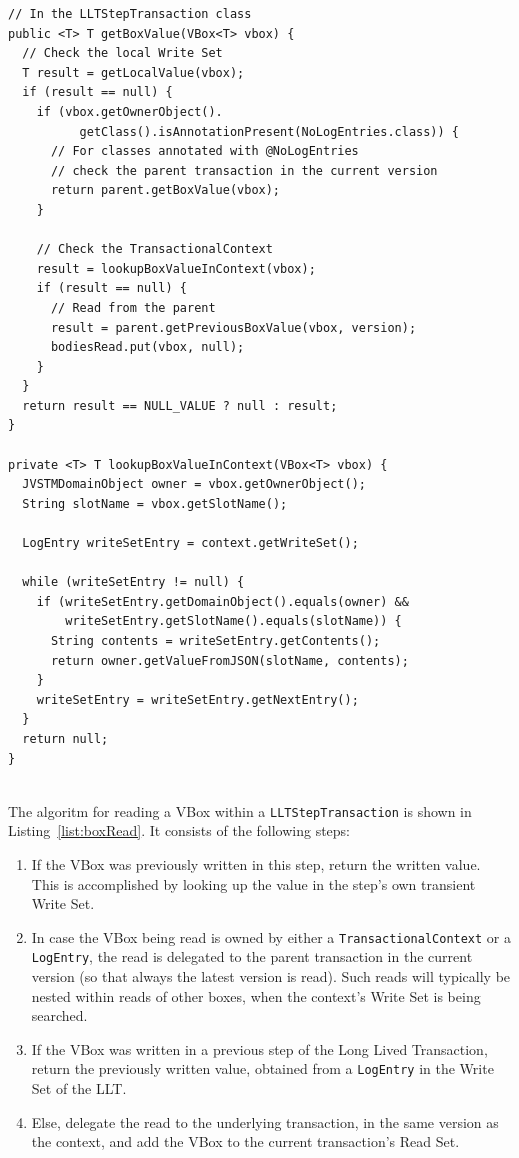 \documentclass{llncs}
\begin{document}
\begin{lstlisting}[caption={Reading a VBox within a
    LLTStepTransaction}, label={list:boxRead}, float]
// In the LLTStepTransaction class
public <T> T getBoxValue(VBox<T> vbox) {
  // Check the local Write Set
  T result = getLocalValue(vbox);
  if (result == null) {
    if (vbox.getOwnerObject().
          getClass().isAnnotationPresent(NoLogEntries.class)) {
      // For classes annotated with @NoLogEntries
      // check the parent transaction in the current version
      return parent.getBoxValue(vbox);
    }

    // Check the TransactionalContext
    result = lookupBoxValueInContext(vbox);
    if (result == null) {
      // Read from the parent
      result = parent.getPreviousBoxValue(vbox, version);
      bodiesRead.put(vbox, null);
    }
  }
  return result == NULL_VALUE ? null : result;
}

private <T> T lookupBoxValueInContext(VBox<T> vbox) {
  JVSTMDomainObject owner = vbox.getOwnerObject();
  String slotName = vbox.getSlotName();

  LogEntry writeSetEntry = context.getWriteSet();

  while (writeSetEntry != null) {
    if (writeSetEntry.getDomainObject().equals(owner) &&
        writeSetEntry.getSlotName().equals(slotName)) {
      String contents = writeSetEntry.getContents();
      return owner.getValueFromJSON(slotName, contents);
    }
    writeSetEntry = writeSetEntry.getNextEntry();
  }
  return null;
}


\end{lstlisting}

The algoritm for reading a VBox within a \texttt{LLTStepTransaction} is shown in
Listing~\ref{list:boxRead}. It consists of the following steps:

\begin{enumerate}

\item If the VBox was previously written in this step, return the
  written value. This is accomplished by looking up the value in the
  step's own transient Write Set.

\item In case the VBox being read is owned by either a
  \texttt{TransactionalContext} or a \texttt{LogEntry}, the read is
  delegated to the parent transaction in the current version (so that
  always the latest version is read). Such reads will typically be
  nested within reads of other boxes, when the context's Write Set is
  being searched.

\item If the VBox was written in a previous step of the Long Lived
  Transaction, return the previously written value, obtained from a
  \texttt{LogEntry} in the Write Set of the LLT.

\item Else, delegate the read to the underlying transaction, in the
  same version as the context, and add the VBox to the current
  transaction's Read Set.

\end{enumerate}
\end{document}
